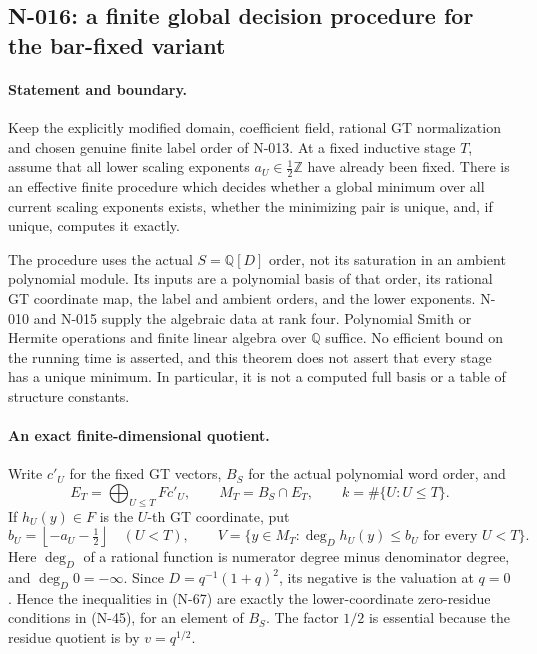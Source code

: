 \subsection{N-016: a finite global decision procedure for the bar-fixed variant}
\label{sec:nonstandard-finite-cutoff}

\paragraph{Statement and boundary.}
Keep the explicitly modified domain, coefficient field,
rational GT normalization and chosen genuine finite label
order of N-013.  At a fixed inductive stage $T$, assume that
all lower scaling exponents $a_U\in\tfrac12\mathbb Z$ have
already been fixed.  There is an effective finite procedure
which decides whether a global minimum over all current
scaling exponents exists, whether the minimizing pair is
unique, and, if unique, computes it exactly.

The procedure uses the actual $S=\mathbb Q[D]$ order, not
its saturation in an ambient polynomial module.  Its inputs
are a polynomial basis of that order, its rational GT
coordinate map, the label and ambient orders, and the lower
exponents.  N-010 and N-015 supply the algebraic data at rank
four.  Polynomial Smith or Hermite operations and finite
linear algebra over $\mathbb Q$ suffice.  No efficient bound
on the running time is asserted, and this theorem does not
assert that every stage has a unique minimum.  In particular,
it is not a computed full basis or a table of structure
constants.

\paragraph{An exact finite-dimensional quotient.}
Write $c'_U$ for the fixed GT vectors, $B_S$ for the actual
polynomial word order, and
\[
 E_T=\bigoplus_{U\le T}F c'_U,\qquad
 M_T=B_S\cap E_T,
 \qquad k=\#\{U:U\le T\}.
 \tag{N-66}
\]
If $h_U(y)\in F$ is the $U$-th GT coordinate, put
\[
 b_U=\left\lfloor-a_U-\tfrac12\right\rfloor\quad(U<T),
 \qquad
 V=\{y\in M_T:\deg_D h_U(y)\le b_U\text{ for every }U<T\}.
 \tag{N-67}
\]
Here $\deg_D$ of a rational function is numerator degree
minus denominator degree, and $\deg_D0=-\infty$.
Since $D=q^{-1}(1+q)^2$, its negative is the valuation at
$q=0$.  Hence the inequalities in (N-67) are exactly the
lower-coordinate zero-residue conditions in (N-45), for
an element of $B_S$.  The factor $1/2$ is essential because
the residue quotient is by $v=q^{1/2}$.

